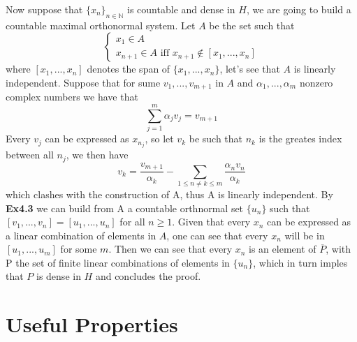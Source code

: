 \documentclass{article}
\begin{document}
\begin{exercise}
Now suppose that $\{x_n\}_{n \in \mathbb{N}}$ is countable and dense in $H$, we are going to build a countable maximal orthonormal system. Let $A$ be the set such that
\[
   \begin{cases}
      x_1 \in A \\
      x_{n+1} \in A \text{ iff } x_{n+1} \notin [ x_1, ..., x_n ]
   \end{cases} 
\]
where $[x_1, ..., x_n]$ denotes the span of $\{x_1, ..., x_n\}$, let's see that $A$ is linearly independent. Suppose that for sume $v_1, ..., v_{m+1}$ in $A$ and $\alpha_1, ..., \alpha_m$ nonzero complex numbers we have that
\[
    \sum_{j=1}^{m} \alpha_j v_j = v_{m+1}
\]
Every $v_j$ can be expressed as $x_{n_j}$, so let $v_k$ be such that $n_k$ is the greates index between all $n_j$, we then have
\[
    v_k = \frac{v_{m+1}}{\alpha_k} - \sum_{1 \le n \neq k \le m} \frac{\alpha_n v_n}{\alpha_k}
\]
which clashes with the construction of A, thus A is linearly independent. By \textbf{Ex4.3} we can build from A a countable orthnormal set $\{u_n\}$ such that $[v_1, ..., v_n] = [u_1, ..., u_n]$ for all $n \ge 1$. Given that every $x_n$ can be expressed as a linear combination of elements in $A$, one can see that every $x_n$ will be in $[u_1, ..., u_m]$ for some $m$. Then we can see that every $x_n$ is an element of $\overline{P}$, with P the set of finite linear combinations of elements in $\{u_n\}$, which in turn imples that $P$ is dense in $H$ and concludes the proof. 
\end{exercise}

\section*{Useful Properties}
\end{document}
